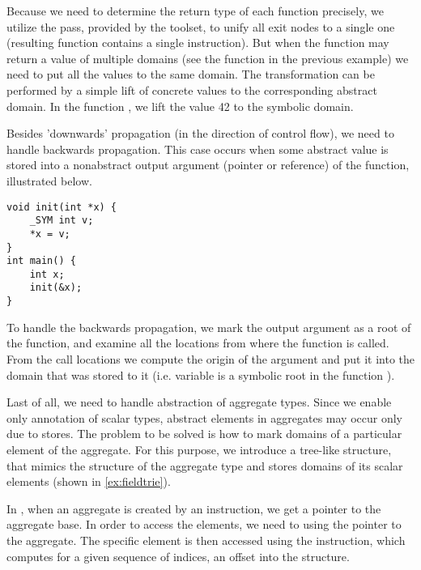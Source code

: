 Because we need to determine the return type of each function precisely, we
utilize the  pass, provided by the \LLVM toolset,
to unify all exit nodes to a single one (resulting function contains a single
 instruction). But when the function may return a value of multiple
domains (see the function  in the previous example) we need to put all
the values to the same domain. The transformation can be performed by a simple
lift of concrete values to the corresponding abstract domain. In the function
, we lift the value 42 to the symbolic domain.

Besides 'downwards' propagation (in the direction of control flow), we need
to handle backwards propagation. This case occurs when some abstract value is
stored into a nonabstract output argument (pointer or reference) of the function,
illustrated below.
\begin{verbatim}
void init(int *x) {
    _SYM int v;
    *x = v;
}
int main() {
    int x;
    init(&x);
}
\end{verbatim}

To handle the backwards propagation, we mark the output argument as a root of the
function, and examine all the locations from where the function is called. From
the call locations we compute the origin of the argument and put it into the
domain that was stored to it (i.e. variable  is a symbolic root
in the function ).

Last of all, we need to handle abstraction of aggregate types. Since we enable
only annotation of scalar types, abstract elements in aggregates may occur
only due to stores. The problem to be solved is how to mark domains of a
particular element of the aggregate. For this purpose, we introduce a tree-like
structure, that mimics the structure of the aggregate type and stores domains of
its scalar elements (shown in \autoref{ex:fieldtrie}).

In \LLVM, when an aggregate is created by an  instruction, we get a
pointer to the aggregate base. In order to access the elements, we need to
 using the pointer to the aggregate. The specific element is then
accessed using the  instruction, which computes for a given
sequence of indices, an offset into the structure.


